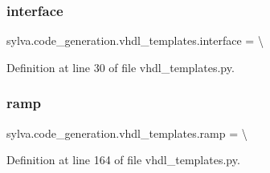 \subsubsection{\texorpdfstring{interface}{interface}}
{\footnotesize\ttfamily sylva.\+code\+\_\+generation.\+vhdl\+\_\+templates.\+interface = \textbackslash{}}



Definition at line 30 of file vhdl\+\_\+templates.\+py.

\mbox{\label{namespacesylva_1_1code__generation_1_1vhdl__templates_a24ad74bfbabdccb2cdb0609c95323a03}} 
\subsubsection{\texorpdfstring{ramp}{ramp}}
{\footnotesize\ttfamily sylva.\+code\+\_\+generation.\+vhdl\+\_\+templates.\+ramp = \textbackslash{}}



Definition at line 164 of file vhdl\+\_\+templates.\+py.

